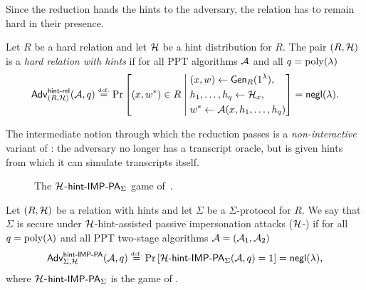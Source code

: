 Since the reduction hands the hints to the adversary, the relation has to remain
hard in their presence.

\begin{definition}\label{def:hard-rel-hints}
    Let $R$ be a hard relation and let $\mathcal{H}$ be a hint distribution for
    $R$.
    The pair $(R, \mathcal{H})$ is a \emph{hard relation with hints} if for all
    PPT algorithms $\mathcal{A}$ and all $q = \operatorname{poly}(\lambda)$
    \begin{equation}
        \mathsf{Adv}^{\mathsf{hint}\text{-}\mathsf{rel}}_{(R, \mathcal{H})}(\mathcal{A}, q) \overset{\scriptscriptstyle\mathrm{def.}}{=}
        \Pr\left[(x, w^*) \in R \;\middle|\;
            \begin{aligned}
                & (x,w) \gets \operatorname{\mathsf{Gen}}_R(1^{\lambda}), \\
                & h_1 , \ldots, h_{q} \gets \mathcal{H}_x, \\
                & w^* \gets \mathcal{A}(x, h_1 , \ldots, h_{q})
            \end{aligned}
        \right] = \mathsf{negl}(\lambda).
    \end{equation}
\end{definition}

The intermediate notion through which the reduction passes is a
\emph{non-interactive} variant of \IMPPA: the adversary no longer has a
transcript oracle, but is given hints from which it can simulate transcripts
itself.

\begin{figure}[htb]
    \centering
    \caption{The $\mathcal{H}$-$\mathsf{hint}\text{-}\mathsf{IMP}\text{-}\mathsf{PA}_\Sigma$ game
        of~\cite[Game~3]{C:ABDPW25}.}\label{fig:hint-imppa}
\end{figure}

\begin{definition}\label{def:hint-imppa}
    Let $(R, \mathcal{H})$ be a relation with hints and let $\Sigma$ be a
    $\Sigma$-protocol for $R$.
    We say that $\Sigma$ is secure under $\mathcal{H}$-hint-assisted passive
    impersonation attacks ($\mathcal{H}$-\hintIMPPA) if for all $q =
    \operatorname{poly}(\lambda)$ and all PPT two-stage algorithms $\mathcal{A} = (\mathcal{A}_1, \mathcal{A}_2)$
    \begin{equation}\label{eq:hint-imppa-adv}
        \mathsf{Adv}^{\mathsf{hint}\text{-}\mathsf{IMP}\text{-}\mathsf{PA}}_{\Sigma,\mathcal{H}}(\mathcal{A},q) \overset{\scriptscriptstyle\mathrm{def.}}{=}
        \Pr\left[\mathcal{H}\text{-}\mathsf{hint}\text{-}\mathsf{IMP}\text{-}\mathsf{PA}_\Sigma(\mathcal{A}, q) = 1\right]
        = \mathsf{negl}(\lambda),
    \end{equation}
    where $\mathcal{H}$-$\mathsf{hint}\text{-}\mathsf{IMP}\text{-}\mathsf{PA}_\Sigma$ is the game of
    .
\end{definition}

